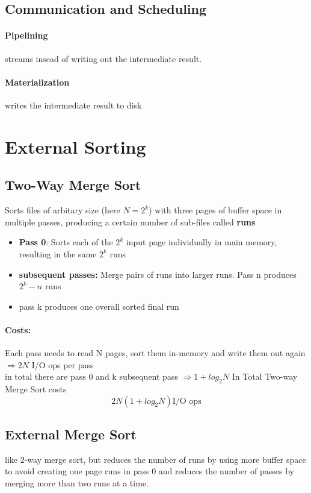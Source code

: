 \subsection{Communication and Scheduling}
\paragraph{Pipelining} streams insead of writing out the intermediate result. \\
\paragraph{Materialization} writes the intermediate result to disk

 
 \section{External Sorting}
 
 \subsection{Two-Way Merge Sort}
 Sorts files of arbitary size (here $N=2^k$) with three pages of buffer space in multiple passes, producing a certain number of sub-files called \textbf{runs}
 \begin{itemize}
     \item \textbf{Pass 0}: Sorts each of the $2^k$ input page individually in main memory, resulting in the same $2^k$ runs
     \item \textbf{subsequent passes:} Merge pairs of runs into larger runs. Pass n produces $2^k-n$ runs
     \item pass k produces one overall sorted final run
 \end{itemize}
 
 \paragraph{Costs:} Each pass needs to read N pages, sort them in-memory and write them out again $\Rightarrow 2N$ I/O ops per pass \\
 in total there are pass 0 and k subsequent pass $\Rightarrow 1 + log_2 {N}$
In Total Two-way Merge Sort costs \[ 2 N (1+ log_2 {N}) \text{I/O ops}\]
 
 \subsection{External Merge Sort}
 like 2-way merge sort, but reduces the number of runs by using more buffer space to avoid creating one page runs in pass 0 and reduces the number of passes by merging more than two runs at a time.
 
